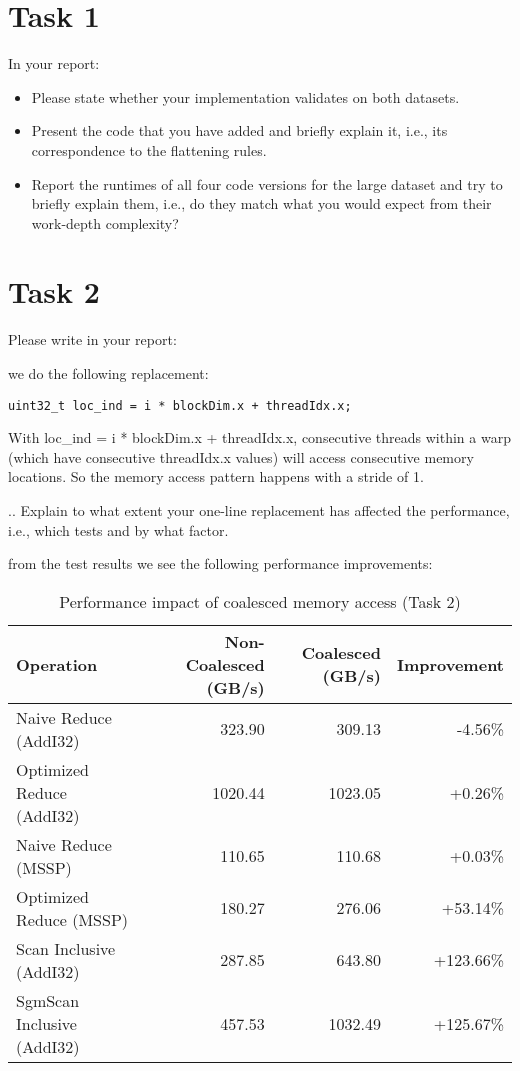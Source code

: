 \documentclass{article}
\begin{document}
\section{Task 1}

In your report:

\begin{itemize}
  \item Please state whether your implementation validates on both datasets.
  \item Present the code that you have added and briefly explain it, i.e., its correspondence to the flattening rules.
  \item Report the runtimes of all four code versions for the large dataset and try to briefly explain them, i.e., do they match what you would expect from their work-depth complexity?
\end{itemize}

\section{Task 2}

Please write in your report:


  we do the following replacement:
  \begin{lstlisting}[language=cuda]
    uint32_t loc_ind = i * blockDim.x + threadIdx.x;
  \end{lstlisting}

  With loc\_ind = i * blockDim.x + threadIdx.x, consecutive threads within a warp (which have consecutive threadIdx.x values) will access consecutive memory locations.
  So the memory access pattern happens with a stride of 1.

  .. Explain to what extent your one-line replacement has affected the performance, i.e., which tests and by what factor.
  
  from the test results we see the following performance improvements:

  \begin{table}[h]
    \centering
    \begin{tabular}{|l|r|r|r|}
    \hline
    \textbf{Operation} & \textbf{Non-Coalesced (GB/s)} & \textbf{Coalesced (GB/s)} & \textbf{Improvement} \\
    \hline
    Naive Reduce (AddI32) & 323.90 & 309.13 & -4.56\% \\
    Optimized Reduce (AddI32) & 1020.44 & 1023.05 & +0.26\% \\
    Naive Reduce (MSSP) & 110.65 & 110.68 & +0.03\% \\
    Optimized Reduce (MSSP) & 180.27 & 276.06 & +53.14\% \\
    Scan Inclusive (AddI32) & 287.85 & 643.80 & +123.66\% \\
    SgmScan Inclusive (AddI32) & 457.53 & 1032.49 & +125.67\% \\
    \hline
    \end{tabular}
    \caption{Performance impact of coalesced memory access (Task 2)}
    \label{tab:task2_perf}
  \end{table}
\end{document}
